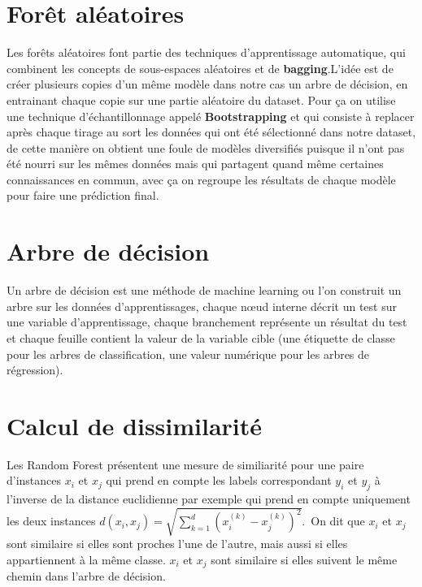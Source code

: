 \documentclass[12pt,a4paper]{report}
\begin{document}
{\color{MidnightBlue}\section{Forêt aléatoires}}
\par Les forêts aléatoires font partie des techniques d'apprentissage automatique, qui combinent les concepts de sous-espaces aléatoires et de \textbf{bagging}.L'idée est de créer plusieurs copies d'un même modèle dans notre cas un arbre de décision, en entrainant chaque copie sur une partie aléatoire du dataset. Pour ça on utilise une technique d'échantillonnage appelé \textbf{Bootstrapping} et qui consiste à replacer après chaque tirage au sort les données qui ont été sélectionné dans notre dataset, de cette manière on obtient une foule de modèles diversifiés puisque il n'ont pas été nourri sur les mêmes données mais qui partagent quand même certaines connaissances en commun, avec ça on regroupe les résultats de chaque modèle pour faire une prédiction final.

{\color{MidnightBlue}\section{Arbre de décision}}
\par Un arbre de décision est une méthode de machine learning ou l'on construit un arbre sur les données d'apprentissages, chaque nœud interne décrit un test sur une variable d'apprentissage, chaque branchement représente un résultat du test et chaque feuille contient la valeur de la variable cible (une étiquette de classe pour les arbres de classification, une valeur numérique pour les arbres de régression).


{\color{MidnightBlue}\section{Calcul de dissimilarité}}
\par Les Random Forest présentent une mesure de similiarité pour une paire d'instances $x_i$ et $x_j$ qui prend en compte les labels correspondant $y_i$ et $y_j$ à l'inverse de la distance euclidienne par exemple qui prend en compte uniquement les deux instances $d(x_i,x_j)=\sqrt{\sum_{k=1}^d (x_i^{(k)} - x_j^{(k)})^2}$.\
On dit que $x_i$ et $x_j$ sont similaire si elles sont proches l'une de l'autre, mais aussi si elles appartiennent à la même classe. $x_i$ et $x_j$ sont similaire si elles suivent le même chemin dans l'arbre de décision. \
\end{document}
